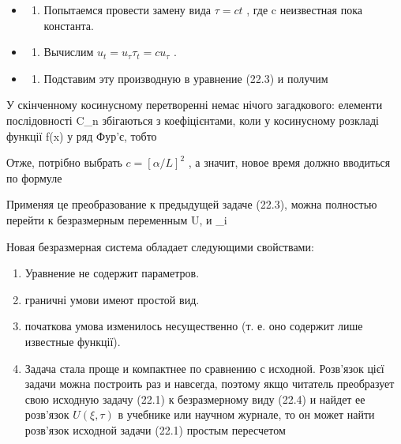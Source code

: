 \documentclass[
  ukrainian,
]{article}
\providecommand{\tightlist}{%
  \setlength{\itemsep}{0pt}\setlength{\parskip}{0pt}}
\begin{document}
\begin{itemize}
\tightlist
\item
  \begin{enumerate}
  \def\labelenumi{\arabic{enumi}.}
  \tightlist
  \item
    Попытаемся провести замену вида \(\tau = ct\) , где c неизвестная
    пока константа.
  \end{enumerate}
\item
  \begin{enumerate}
  \def\labelenumi{\arabic{enumi}.}
  \setcounter{enumi}{1}
  \tightlist
  \item
    Вычислим \(u_t = u_{\tau} \tau_t = c u_{\tau}\) .
  \end{enumerate}
\item
  \begin{enumerate}
  \def\labelenumi{\arabic{enumi}.}
  \setcounter{enumi}{2}
  \tightlist
  \item
    Подставим эту производную в уравнение (22.3) и получим
  \end{enumerate}
\end{itemize}

У скінченному косинусному перетворенні немає нічого загадкового:
елементи послідовності C\_n збігаються з коефіцієнтами, коли 
у косинусному розкладі функції f(x) у ряд Фур'є, тобто

Отже, потрібно выбрать \(c = [\alpha/L]^2\) , а значит, новое время
должно вводиться по формуле

Применяя це преобразование к предыдущей задаче (22.3), можна полностью
перейти к безразмерным переменным U, \xi  и \tau\_i

Новая безразмерная система обладает следующими свойствами:

\begin{enumerate}
\def\labelenumi{\arabic{enumi}.}
\item
  Уравнение не содержит параметров.
\item
  граничні умови имеют простой вид.
\item
  початкова умова изменилось несущественно (т. е. оно содержит лише
  известные функції).
\item
  Задача стала проще и компактнее по сравнению с исходной. Розв'язок
  цієї задачи можна построить раз и навсегда, поэтому якщо читатель
  преобразует свою исходную задачу (22.1) к безразмерному виду (22.4) и
  найдет ее розв'язок \(U(\xi, \tau)\) в учебнике или научном журнале,
  то он может найти розв'язок исходной задачи (22.1) простым пересчетом
\end{enumerate}
\end{document}
